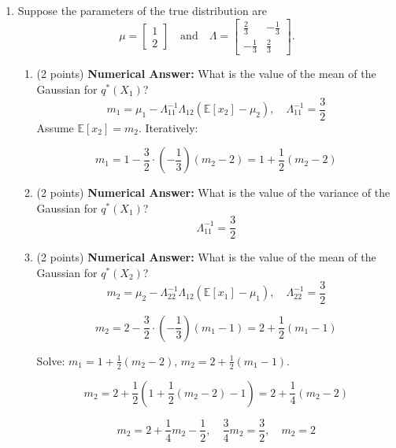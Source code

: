 \documentclass[a3paper,12pt]{extarticle} %
\begin{document}
\begin{enumerate}
\begin{enumerate}
            \[
            \begin{tikzpicture}
                \draw[->] (-3,0) -- (3,0) node[right] {$x_1$};
                \draw[->] (0,-5) -- (0,5) node[above] {$x_2$};
                \draw[blue, thick] (0,0) ellipse (1 and 4) node[above right, blue] {$p(\mathbf{x}), q^*(\mathbf{x})$};
            \end{tikzpicture}
            \]
        \end{enumerate}
    \item  Suppose the parameters of the true distribution are 
    \[
    \mu = 
    \begin{bmatrix}
    1 \\
    2
    \end{bmatrix}
    \quad \text{and} \quad
    \Lambda = 
    \begin{bmatrix}
    \frac{2}{3} & -\frac{1}{3} \\
    -\frac{1}{3} & \frac{2}{3}
    \end{bmatrix}.
    \]
    
        \begin{enumerate}
            \item[(a)] (2 points) \textbf{Numerical Answer:} What is the value of the mean of the Gaussian for \( q^*(X_1) \)?
  \[
m_1 = \mu_1 - \Lambda_{11}^{-1} \Lambda_{12} (\mathbb{E}[x_2] - \mu_2), \quad \Lambda_{11}^{-1} = \frac{3}{2}
\]
Assume \(\mathbb{E}[x_2] = m_2\). Iteratively:

\[
m_1 = 1 - \frac{3}{2} \cdot \left(-\frac{1}{3}\right) (m_2 - 2) = 1 + \frac{1}{2} (m_2 - 2)
\]
            \item[(b)] (2 points) \textbf{Numerical Answer:} What is the value of the variance of the Gaussian for \( q^*(X_1) \)?
            \[
\Lambda_{11}^{-1} = \frac{3}{2}
\]
            \item[(c)] (2 points) \textbf{Numerical Answer:} What is the value of the mean of the Gaussian for \( q^*(X_2) \)?
           \[
m_2 = \mu_2 - \Lambda_{22}^{-1} \Lambda_{12} (\mathbb{E}[x_1] - \mu_1), \quad \Lambda_{22}^{-1} = \frac{3}{2}
\]

\[
m_2 = 2 - \frac{3}{2} \cdot \left(-\frac{1}{3}\right) (m_1 - 1) = 2 + \frac{1}{2} (m_1 - 1)
\]

Solve: \(m_1 = 1 + \frac{1}{2} (m_2 - 2)\), \(m_2 = 2 + \frac{1}{2} (m_1 - 1)\).

\[
m_2 = 2 + \frac{1}{2} \left( 1 + \frac{1}{2} (m_2 - 2) - 1 \right) = 2 + \frac{1}{4} (m_2 - 2)
\]

\[
m_2 = 2 + \frac{1}{4} m_2 - \frac{1}{2}, \quad \frac{3}{4} m_2 = \frac{3}{2}, \quad m_2 = 2
\]


\end{enumerate}
\end{enumerate}
\end{document}
